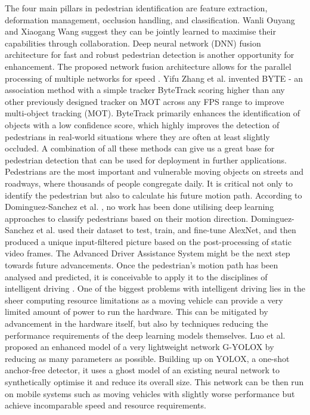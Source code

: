 \documentclass[11pt,a4paper]{article}
\begin{document}
The four main pillars in pedestrian identification are feature extraction, deformation management, occlusion handling, and classification. Wanli Ouyang and Xiaogang Wang \cite{ouyang2013joint} suggest they can be jointly learned to maximise their capabilities through collaboration. Deep neural network (DNN) fusion architecture for fast and robust pedestrian detection is another opportunity for enhancement. The proposed network fusion architecture allows for the parallel processing of multiple networks for speed \cite{du2017fused}. Yifu Zhang et al. \cite{zhang2022bytetrack} invented BYTE - an association method with a simple tracker ByteTrack scoring higher than any other previously designed tracker on MOT across any FPS range to improve multi-object tracking (MOT). ByteTrack primarily enhances the identification of objects with a low confidence score, which highly improves the detection of pedestrians in real-world situations where they are often at least slightly occluded. A combination of all these methods can give us a great base for pedestrian detection that can be used for deployment in further applications.
\newline\newline
Pedestrians are the most important and vulnerable moving objects on streets and roadways, where thousands of people congregate daily. It is critical not only to identify the pedestrian but also to calculate his future motion path. According to Dominguez-Sanchez et al. \cite{dominguez2017pedestrian}, no work has been done utilising deep learning approaches to classify pedestrians based on their motion direction. Dominguez-Sanchez et al. \cite{dominguez2017pedestrian} used their dataset to test, train, and fine-tune AlexNet, and then produced a unique input-filtered picture based on the post-processing of static video frames. The Advanced Driver Assistance System might be the next step towards future advancements. Once the pedestrian’s motion path has been analysed and predicted, it is conceivable to apply it to the disciplines of intelligent driving \cite{tian2021review}.
\newline\newline
One of the biggest problems with intelligent driving lies in the sheer computing resource limitations as a moving vehicle can provide a very limited amount of power to run the hardware. This can be mitigated by advancement in the hardware itself, but also by techniques reducing the performance requirements of the deep learning models themselves. Luo et al. \cite{luo2022g} proposed an enhanced model of a very lightweight network G-YOLOX by reducing as many parameters as possible. Building up on YOLOX, a one-shot anchor-free detector, it uses a ghost model of an existing neural network to synthetically optimise it and reduce its overall size. This network can be then run on mobile systems such as moving vehicles with slightly worse performance but achieve incomparable speed and resource requirements.
\end{document}
